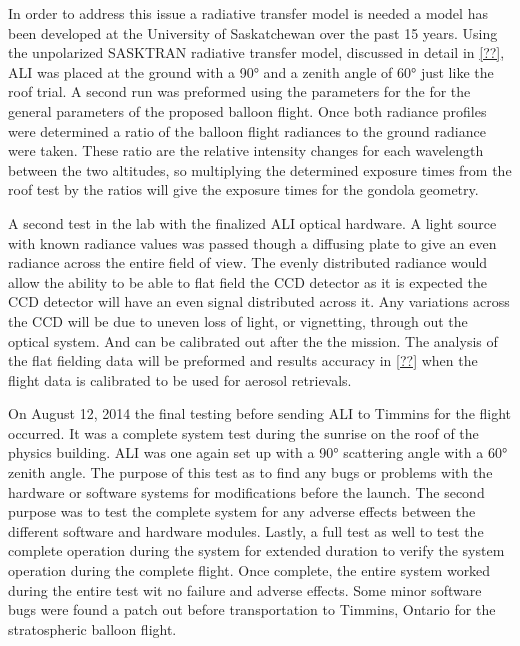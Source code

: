 In order to address this issue a radiative transfer model is needed a model has been developed at the University of Saskatchewan over the past 15 years. Using the unpolarized SASKTRAN radiative transfer model, discussed in detail in \autoref{??}, ALI was placed at the ground with a 90\si{\degree} and a zenith angle of 60\si{\degree} just like the roof trial. A second run was preformed using the parameters for the for the general parameters of the proposed balloon flight. Once both radiance profiles were determined a ratio of the balloon flight radiances to the ground radiance were taken. These ratio are the relative intensity changes for each wavelength between the two altitudes, so multiplying the determined exposure times from the roof test by the ratios will give the exposure times for the gondola geometry.

A second test in the lab with the finalized ALI optical hardware. A light source with known radiance values was passed though a diffusing plate to give an even radiance across the entire field of view. The evenly distributed radiance would allow the ability to be able to flat field the CCD detector as it is expected the CCD detector will have an even signal distributed across it. Any variations across the CCD will be due to uneven loss of light, or vignetting, through out the optical system. And can be calibrated out after the the mission. The analysis of the flat fielding data will be preformed and results accuracy in \autoref{??} when the flight data is calibrated to be used for aerosol retrievals.

On August 12, 2014 the final testing before sending ALI to Timmins for the flight occurred. It was a complete system test during the sunrise on the roof of the physics building. ALI was one again set up with a 90\si{\degree} scattering angle with a 60\si{\degree} zenith angle. The purpose of this test as to find any bugs or problems with the hardware or software systems for modifications before the launch. The second purpose was to test the complete system for any adverse effects between the different software and hardware modules. Lastly, a full test as well to test the complete operation during the system for extended duration to verify the system operation during the complete flight. Once complete, the entire system worked during the entire test wit no failure and adverse effects. Some minor software bugs were found a patch out before transportation to Timmins, Ontario for the stratospheric balloon flight.  